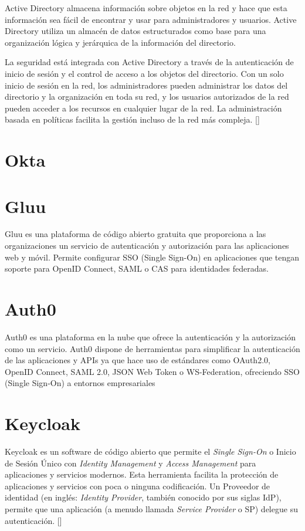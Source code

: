 Active Directory almacena información sobre objetos en la red y hace que esta información sea fácil de encontrar y usar para administradores y usuarios. Active Directory utiliza un almacén de datos estructurados como base para una organización lógica y jerárquica de la información del directorio.

La seguridad está integrada con Active Directory a través de la autenticación de inicio de sesión y el control de acceso a los objetos del directorio. Con un solo inicio de sesión en la red, los administradores pueden administrar los datos del directorio y la organización en toda su red, y los usuarios autorizados de la red pueden acceder a los recursos en cualquier lugar de la red. La administración basada en políticas facilita la gestión incluso de la red más compleja.
[\cite{active-directoy-doc}]



\section{Okta}

\section{Gluu}
Gluu es una plataforma de código abierto gratuita que proporciona a las organizaciones un servicio de autenticación y autorización para las aplicaciones web y móvil. Permite configurar SSO (Single Sign-On) en aplicaciones que tengan soporte para OpenID Connect, SAML o  CAS para identidades federadas.

\section{Auth0}
Auth0 es una plataforma en la nube que ofrece la autenticación y la autorización como un servicio. Auth0 dispone de herramientas para simplificar la autenticación de las aplicaciones y APIs ya que hace uso de estándares como OAuth2.0, OpenID Connect, SAML 2.0, JSON Web Token o WS-Federation, ofreciendo SSO (Single Sign-On) a entornos empresariales

\section{Keycloak}
Keycloak es un software de código abierto que permite el \textit{Single Sign-On} o Inicio de Sesión Único con \textit{Identity Management} y \textit{Access Management} para aplicaciones y servicios modernos. Esta herramienta facilita la protección de aplicaciones y servicios con poca o ninguna codificación. Un Proveedor de identidad (en inglés: \textit{Identity Provider}, también conocido por sus siglas IdP), permite que una aplicación (a menudo llamada \textit{Service Provider} o SP) delegue su autenticación. [\cite{KeycloakDoc}]

